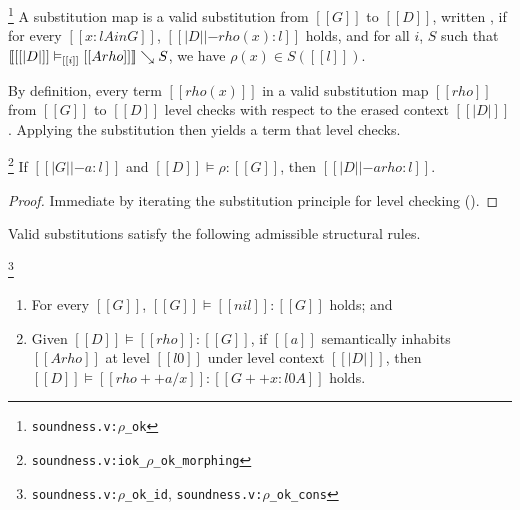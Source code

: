 \documentclass[acmsmall, screen=true, nonacm=true,
  review=\ifpublic false\else true\fi,
  anonymous=\ifanonymous true\else false\fi
]{acmart}
\DeclarePairedDelimiter{\bracks}{\llbracket}{\rrbracket}
\newcommand{\suppl}[3]{{\scriptsize\texttt{#2:#3}}}
\newcommand{\judgement}[1]{{\setlength{\fboxsep}{1.5pt}\fbox{#1}}}
\newcommand{\interp}[4]{\bracks{#1 \vDash_{#2} #3} \searrow #4}
\newcommand{\member}[3]{#1 \in #3(#2)}
\newcommand{\sws}[3]{#1 \vDash #2 : #3}
\newlength{\punctwidth}
\newcommand{\stack}[1]{%
  \settowidth{\punctwidth}{#1}%
  \hspace*{-\the\punctwidth}%
}
\begin{document}
\begin{definition}
  \stack{.~}\footnote{\suppl{theories}{soundness.v}{$\rho$\_ok}}
  \label{def:semwf}
  A substitution map is a valid substitution 
  from $[[G]]$ to $[[D]]$,
  written \judgement{$\sws{[[D]]}{\rho}{[[G]]}$},
  if for every $[[x : l A in G]]$,
  $[[| D | |- rho(x) : l]]$ holds,
  and for all $i$, $S$ such that
  $\interp{[[|D|]]}{[[i]]}{[[A { rho }]]}{S}$, 
  we have $\member{\rho(x)}{[[l]]}{S}$.
\end{definition}

By definition, every term $[[rho(x)]]$ in a valid substitution map
$[[rho]]$ from $[[G]]$ to $[[D]]$ level checks with respect to the erased context
$[[|D|]]$. Applying the substitution then yields a term that level checks.

\begin{lemma}
\stack{.~}\footnote{\suppl{theories}{soundness.v}{iok\_$\rho$\_ok\_morphing}}
  If $[[|G| |- a : l]]$ and $\sws{[[D]]}{\rho}{[[G]]}$, then $[[|D| |-
  a{rho} : l ]]$.
\end{lemma}

\begin{proof}
  Immediate by iterating the substitution principle for level checking ().
\end{proof}

Valid substitutions satisfy the following admissible structural rules.

\begin{lemma}
  \stack{.~}\footnote{\suppl{theories}{soundness.v}{$\rho$\_ok\_id}, \suppl{theories}{soundness.v}{$\rho$\_ok\_cons}}
  \label{lem:vsubst}
  \leavevmode
  \begin{enumerate}
    \item \label{lem:vnil} For every $[[G]]$, $\sws{[[G]]}{[[nil]]}{[[G]]}$ holds; and
    \item \label{lem:vcons} Given $\sws{[[D]]}{[[rho]]}{[[G]]}$,
      if $[[a]]$ semantically inhabits $[[A { rho }]]$
      at level $[[l0]]$ under level context $[[| D |]]$,
      then $\sws{[[D]]}{[[rho ++ {a / x} ]]}{[[G ++ x : l0 A ]]}$ holds.
  \end{enumerate}
\end{lemma}
\end{document}
